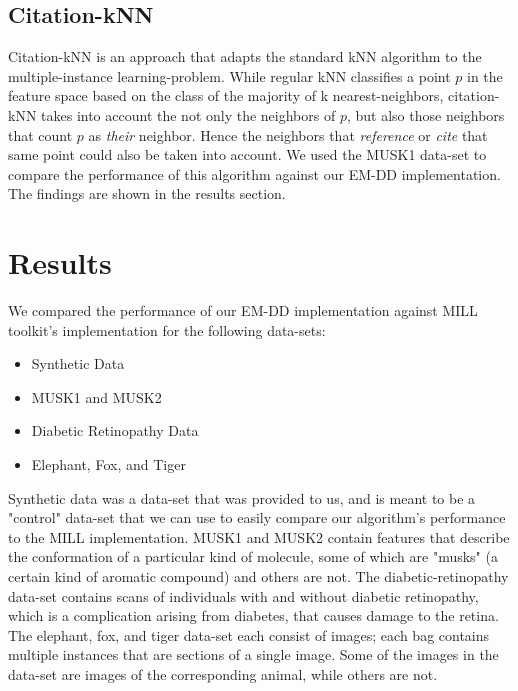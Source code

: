 \documentclass[conference]{IEEEtran}
\begin{document}
\subsection{Citation-kNN}

Citation-kNN\cite{wang2000solving} is an approach that adapts the standard kNN algorithm to the multiple-instance learning-problem. While regular kNN classifies a point $p$ in the feature space based on the class of the majority of k nearest-neighbors, citation-kNN takes into account the not only the neighbors of $p$, but also those neighbors that count $p$ as \textit{their} neighbor. Hence the neighbors that \textit{reference} or \textit{cite} that same point could also be taken into account. We used the MUSK1 data-set to compare the performance of this algorithm against our EM-DD implementation. The findings are shown in the results section.

\section{Results}

We compared the performance of our EM-DD implementation against MILL toolkit's implementation for the following data-sets:
\begin{itemize}
    \item Synthetic Data\cite{SynthDataset}
    \item MUSK1\cite{MUSK1Dataset} and MUSK2\cite{MUSK2Dataset}
    \item Diabetic Retinopathy Data\cite{SynthDataset}
    \item Elephant, Fox, and Tiger\cite{andrews2002support}
\end{itemize}

Synthetic data was a data-set that was provided to us, and is meant to be a "control" data-set that we can use to easily compare our algorithm's performance to the MILL implementation. MUSK1 and MUSK2 contain features that describe the conformation of a particular kind of molecule, some of which are "musks" (a certain kind of aromatic compound) and others are not. The diabetic-retinopathy data-set contains scans of individuals with and without diabetic retinopathy, which is a complication arising from diabetes, that causes damage to the retina. The elephant, fox, and tiger data-set each consist of images; each bag contains multiple instances that are sections of a single image. Some of the images in the data-set are images of the corresponding animal, while others are not. 
\end{document}
